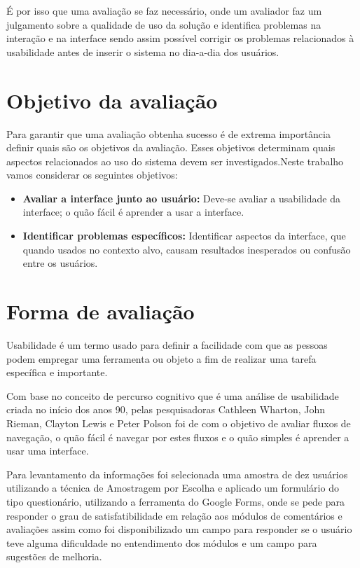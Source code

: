 \documentclass[12pt, a4paper]{report}
\begin{document}
É por isso que uma avaliação se faz necessário, onde um  avaliador faz um julgamento sobre a qualidade de uso da solução e identifica problemas na interação e na interface sendo assim  possível corrigir os problemas relacionados à usabilidade antes de inserir o sistema no dia-a-dia dos usuários.

\section{Objetivo da avaliação }
Para garantir que uma avaliação obtenha sucesso é de extrema importância definir quais são os objetivos da avaliação. Esses objetivos determinam quais aspectos relacionados ao uso do sistema devem ser investigados.Neste trabalho vamos considerar os seguintes objetivos:
\begin{itemize}
 \item{\textbf{Avaliar a interface junto ao usuário:}} Deve-se avaliar a usabilidade da interface; o quão fácil é aprender a usar a interface.
 \item{\textbf{Identificar problemas específicos:}} Identificar aspectos da interface, que quando usados no contexto alvo, causam resultados inesperados ou confusão entre os usuários.
\end{itemize}

\section{Forma de avaliação}

Usabilidade é um termo usado para definir a facilidade com que as pessoas podem empregar uma ferramenta ou objeto a fim de realizar uma tarefa específica e importante. 

Com base no conceito de percurso cognitivo que é uma análise de usabilidade criada  no início dos anos 90, pelas pesquisadoras Cathleen Wharton, John Rieman, Clayton Lewis e Peter Polson foi de com o objetivo de avaliar fluxos de navegação, o quão fácil é navegar por estes fluxos e o quão simples é aprender a usar uma interface.

Para levantamento da informações foi selecionada uma amostra de dez usuários utilizando a técnica de Amostragem por Escolha e aplicado um formulário do tipo questionário, utilizando a ferramenta do Google Forms, onde se pede para responder o grau de satisfatibilidade em relação aos módulos de comentários e avaliações assim como foi disponibilizado um campo para responder se o usuário teve alguma dificuldade no entendimento dos módulos e um campo para sugestões de melhoria.
\end{document}
